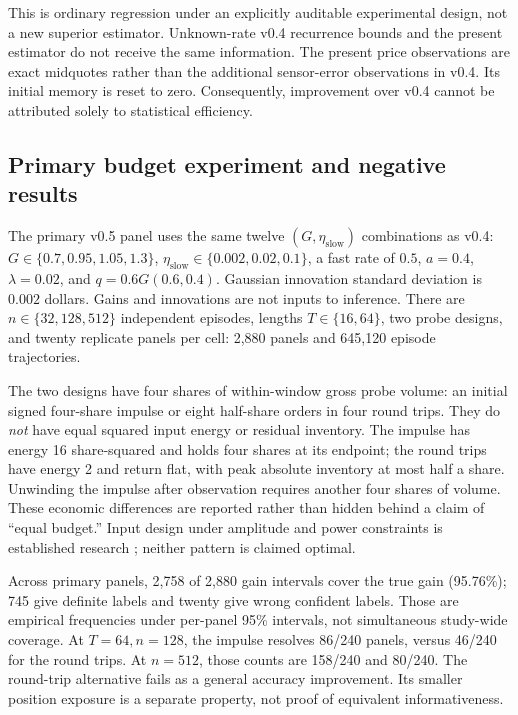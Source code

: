 This is ordinary regression under an explicitly auditable experimental design, not a new superior estimator. Unknown-rate v0.4 recurrence bounds and the present estimator do not receive the same information. The present price observations are exact midquotes rather than the additional sensor-error observations in v0.4. Its initial memory is reset to zero. Consequently, improvement over v0.4 cannot be attributed solely to statistical efficiency.

\subsection{Primary budget experiment and negative results}
The primary v0.5 panel uses the same twelve $(G,\eta_{\mathrm{slow}})$ combinations as v0.4: $G\in\{0.7,0.95,1.05,1.3\}$, $\eta_{\mathrm{slow}}\in\{0.002,0.02,0.1\}$, a fast rate of $0.5$, $a=0.4$, $\lambda=0.02$, and $q=0.6G(0.6,0.4)$. Gaussian innovation standard deviation is $0.002$ dollars. Gains and innovations are not inputs to inference. There are $n\in\{32,128,512\}$ independent episodes, lengths $T\in\{16,64\}$, two probe designs, and twenty replicate panels per cell: 2,880 panels and 645,120 episode trajectories.

The two designs have four shares of within-window gross probe volume: an initial signed four-share impulse or eight half-share orders in four round trips. They do \emph{not} have equal squared input energy or residual inventory. The impulse has energy 16 share-squared and holds four shares at its endpoint; the round trips have energy 2 and return flat, with peak absolute inventory at most half a share. Unwinding the impulse after observation requires another four shares of volume. These economic differences are reported rather than hidden behind a claim of ``equal budget.'' Input design under amplitude and power constraints is established research \citep{manchester2010}; neither pattern is claimed optimal.

Across primary panels, 2,758 of 2,880 gain intervals cover the true gain (95.76\%); 745 give definite labels and twenty give wrong confident labels. Those are empirical frequencies under per-panel 95\% intervals, not simultaneous study-wide coverage. At $T=64,n=128$, the impulse resolves 86/240 panels, versus 46/240 for the round trips. At $n=512$, those counts are 158/240 and 80/240. The round-trip alternative fails as a general accuracy improvement. Its smaller position exposure is a separate property, not proof of equivalent informativeness.

